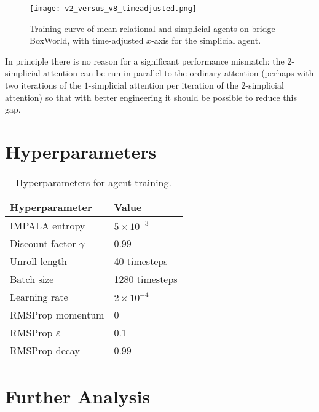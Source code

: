 \documentclass{article} %
\begin{document}
\begin{figure}[h]
\begin{center}
\texttt{[image: v2\_versus\_v8\_timeadjusted.png]}
\end{center}
\caption{Training curve of mean relational and simplicial agents on bridge BoxWorld, with time-adjusted $x$-axis for the simplicial agent.}
\label{figure:winrate_graph_timeadjusted}
\end{figure}

In principle there is no reason for a significant performance mismatch: the $2$-simplicial attention can be run in parallel to the ordinary attention (perhaps with two iterations of the $1$-simplicial attention per iteration of the $2$-simplicial attention) so that with better engineering it should be possible to reduce this gap.



\section{Hyperparameters}
\label{appendix:hyperparams}

\begin{table}[h]
\scriptsize
    \begin{center}
    \begin{tabular}
    {ll}
    \toprule
      \textbf{Hyperparameter}  & \textbf{Value} \\ 
    \midrule
    IMPALA entropy & $5 \times 10^{-3}$\\
    Discount factor $\gamma$ & 0.99\\
    Unroll length & 40 timesteps\\
    Batch size & 1280 timesteps\\
    Learning rate & $2 \times 10^{-4}$\\
    RMSProp momentum & 0 \\
    RMSProp $\varepsilon$ & 0.1 \\
    RMSProp decay & 0.99\\
    \bottomrule

    \end{tabular}
    \end{center}
    \caption{\footnotesize Hyperparameters for agent training.}
    \label{table:hyper}
\end{table}




\section{Further Analysis}\label{appendix:analysis_strategy}
\end{document}
